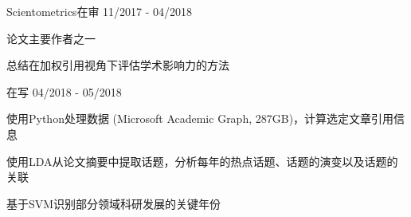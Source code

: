 
\begin{cventries}

\cvexperience
{ Scientometrics在审}
{11/2017 - 04/2018}
{
    \begin{cvitems}
    \item {论文主要作者之一}
    \item {总结在加权引用视角下评估学术影响力的方法}
    \end{cvitems}
}

\cvexperience
{ 在写}
{04/2018 - 05/2018}
{
    \begin{cvitems}
    \item {使用Python处理数据 (Microsoft Academic Graph, 287GB)，计算选定文章引用信息}
    \item {使用LDA从论文摘要中提取话题，分析每年的热点话题、话题的演变以及话题的关联}
    \item {基于SVM识别部分领域科研发展的关键年份}
    \end{cvitems}
}


\end{cventries}